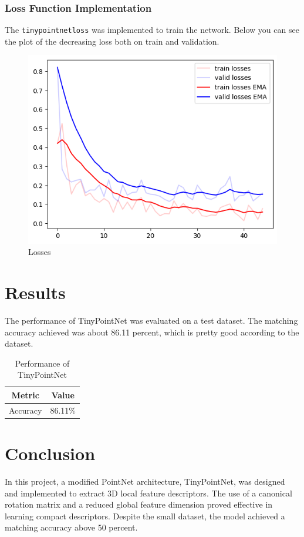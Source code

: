 \documentclass{article}
\begin{document}
\subsubsection{Loss Function Implementation}
The \texttt{tinypointnetloss} was implemented to train the network.
Below you can see the plot of the decreasing loss both on train and validation.

\begin{figure}[h!]
    \centering
	\includegraphics[width=\textwidth]{losses_plot.png}
	\caption{Losses}
    \label{fig:point_clouds}
\end{figure}

\section{Results}

The performance of TinyPointNet was evaluated on a test dataset. The matching accuracy achieved was about 86.11 percent, which is pretty good according to the dataset.

\begin{table}[h]
\centering
\begin{tabular}{|c|c|}
\hline
\textbf{Metric} & \textbf{Value} \\
\hline
Accuracy & 86.11\% \\
\hline
\end{tabular}
\caption{Performance of TinyPointNet}
\end{table}

\section{Conclusion}
In this project, a modified PointNet architecture, TinyPointNet, was designed and implemented to extract 3D local feature descriptors. The use of a canonical rotation matrix and a reduced global feature dimension proved effective in learning compact descriptors. Despite the small dataset, the model achieved a matching accuracy above 50 percent.
\end{document}
